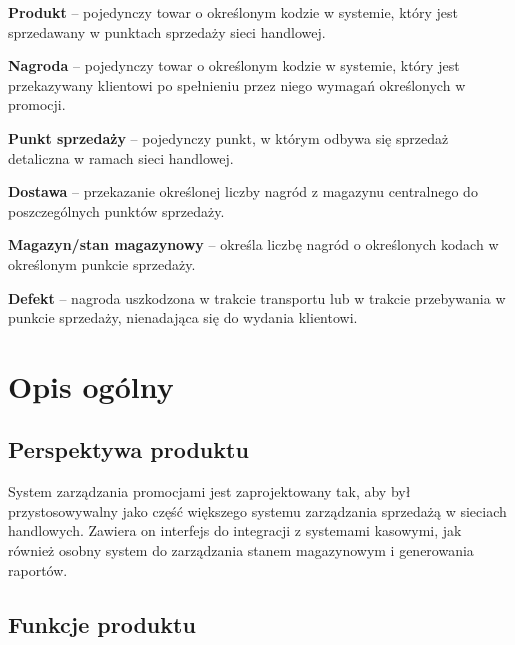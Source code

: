 \documentclass[a4paper,12pt]{article}
\begin{document}
\textbf{Produkt} -- pojedynczy towar o określonym kodzie w systemie, który jest sprzedawany w punktach sprzedaży sieci handlowej.

\textbf{Nagroda} -- pojedynczy towar o określonym kodzie w systemie, który jest przekazywany klientowi po spełnieniu przez niego wymagań określonych w promocji.

\textbf{Punkt sprzedaży} -- pojedynczy punkt, w którym odbywa się sprzedaż detaliczna w ramach sieci handlowej.

\textbf{Dostawa} -- przekazanie określonej liczby nagród z magazynu centralnego do poszczególnych punktów sprzedaży.

\textbf{Magazyn/stan magazynowy} -- określa liczbę nagród o określonych kodach w określonym punkcie sprzedaży.

\textbf{Defekt} -- nagroda uszkodzona w trakcie transportu lub w trakcie przebywania w punkcie sprzedaży, nienadająca się do wydania klientowi.

\section{Opis ogólny}

\subsection{Perspektywa produktu}

System zarządzania promocjami jest zaprojektowany tak, aby był przystosowywalny jako część większego systemu zarządzania sprzedażą w sieciach handlowych.
Zawiera on interfejs do integracji z systemami kasowymi, jak również osobny system do zarządzania stanem magazynowym i generowania raportów.

\subsection{Funkcje produktu}
\end{document}
